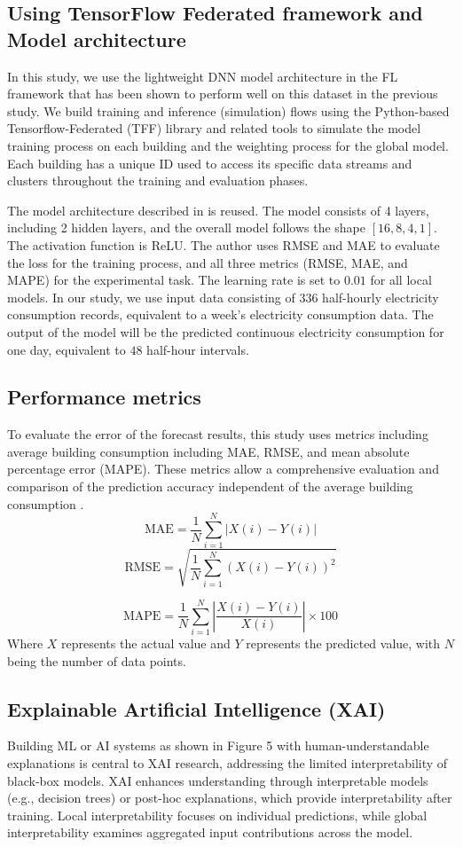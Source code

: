 \documentclass[11pt,a4paper]{article}
\begin{document}
\subsection{Using TensorFlow Federated framework and Model architecture}
In this study, we use the lightweight DNN model architecture in the FL framework that has been shown to perform well on this dataset in the previous study\cite{duttagupta2023exploring}. We build training and inference (simulation) flows using the Python-based Tensorflow-Federated (TFF) library and related tools to simulate the model training process on each building and the weighting process for the global model. Each building has a unique ID used to access its specific data streams and clusters throughout the training and evaluation phases.

The model architecture described in \cite{duttagupta2023exploring} is reused. The model consists of 4 layers, including 2 hidden layers, and the overall model follows the shape $[16, 8, 4, 1]$. The activation function is ReLU. The author uses RMSE and MAE to evaluate the loss for the training process, and all three metrics (RMSE, MAE, and MAPE) for the experimental task. The learning rate is set to $0.01$ for all local models. In our study, we use input data consisting of $336$ half-hourly electricity consumption records, equivalent to a week’s electricity consumption data. The output of the model will be the predicted continuous electricity consumption for one day, equivalent to $48$ half-hour intervals.

\subsection{Performance metrics}
To evaluate the error of the forecast results, this study uses metrics including average building consumption including MAE, RMSE, and mean absolute percentage error (MAPE). These metrics allow a comprehensive evaluation and comparison of the prediction accuracy independent of the average building consumption \cite{duttagupta2023exploring}.
\[
\text{MAE} = \frac{1}{N} \sum_{i=1}^{N} \left| X(i) - Y(i) \right|
\]
\[
\text{RMSE} = \sqrt{\frac{1}{N} \sum_{i=1}^{N} \left( X(i) - Y(i) \right)^2}
\]

\[
\text{MAPE} = \frac{1}{N} \sum_{i=1}^{N} \left| \frac{X(i) - Y(i)}{X(i)} \right| \times 100
\]
Where $X$ represents the actual value and $Y$ represents the predicted value, with $N$ being the number of data points.

\subsection{Explainable Artificial Intelligence (XAI)}
Building ML or AI systems as shown in Figure 5 with human-understandable explanations is central to XAI research, addressing the limited interpretability of black-box models. XAI enhances understanding through interpretable models (e.g., decision trees) or post-hoc explanations, which provide interpretability after training. Local interpretability focuses on individual predictions, while global interpretability examines aggregated input contributions across the model.  
\end{document}
